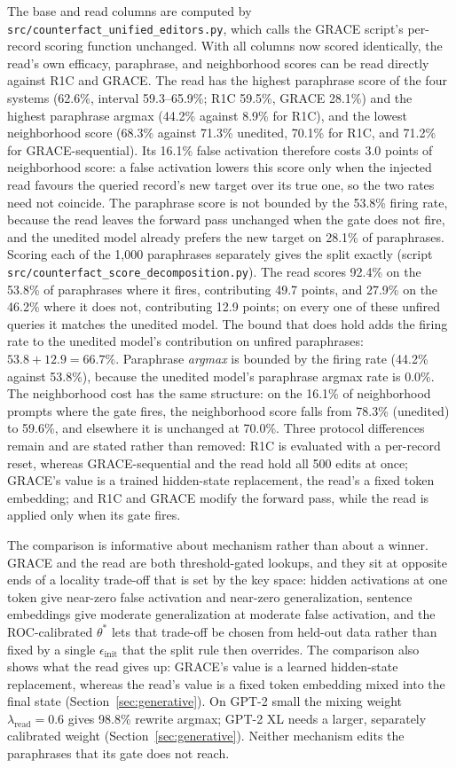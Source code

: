 \documentclass[preprint,12pt]{elsarticle}
\newif\ifmarkchanges
\newcommand{\rev}[1]{#1}
\newcommand{\revii}[1]{\ifmarkchanges{\color{blue}#1}\else#1\fi}
\begin{document}
\rev{The base and read columns are computed by \nolinkurl{src/counterfact_unified_editors.py}, which calls the GRACE script's per-record scoring function unchanged. With all columns now scored identically, the read's own efficacy, paraphrase, and neighborhood scores can be read directly against R1C and GRACE. The read has the highest paraphrase score of the four systems (62.6\%, interval 59.3--65.9\%; R1C 59.5\%, GRACE 28.1\%) and the highest paraphrase argmax (44.2\% against 8.9\% for R1C), and the lowest neighborhood score (68.3\% against 71.3\% unedited, 70.1\% for R1C, and 71.2\% for GRACE-sequential). Its 16.1\% false activation therefore costs 3.0 points of neighborhood score: a false activation lowers this score only when the injected read favours the queried record's new target over its true one, so the two rates need not coincide.} \revii{The paraphrase score is not bounded by the 53.8\% firing rate, because the read leaves the forward pass unchanged when the gate does not fire, and the unedited model already prefers the new target on 28.1\% of paraphrases. Scoring each of the 1,000 paraphrases separately gives the split exactly (script \nolinkurl{src/counterfact_score_decomposition.py}). The read scores 92.4\% on the 53.8\% of paraphrases where it fires, contributing 49.7 points, and 27.9\% on the 46.2\% where it does not, contributing 12.9 points; on every one of these unfired queries it matches the unedited model. The bound that does hold adds the firing rate to the unedited model's contribution on unfired paraphrases: $53.8+12.9=66.7\%$. Paraphrase \emph{argmax} is bounded by the firing rate (44.2\% against 53.8\%), because the unedited model's paraphrase argmax rate is 0.0\%. The neighborhood cost has the same structure: on the 16.1\% of neighborhood prompts where the gate fires, the neighborhood score falls from 78.3\% (unedited) to 59.6\%, and elsewhere it is unchanged at 70.0\%.} Three protocol differences remain and are stated rather than removed: R1C is evaluated with a per-record reset, whereas GRACE-sequential and the read hold all 500 edits at once; GRACE's value is a trained hidden-state replacement, the read's a fixed token embedding; and R1C and GRACE modify the forward pass, while the read is applied only when its gate fires.

The comparison is informative about mechanism rather than about a winner. GRACE and the read are both threshold-gated lookups, and they sit at opposite ends of a locality trade-off that is set by the key space: hidden activations at one token give near-zero false activation and near-zero generalization, sentence embeddings give moderate generalization at moderate false activation, and the ROC-calibrated $\theta^*$ lets that trade-off be chosen from held-out data rather than fixed by a single $\epsilon_{\mathrm{init}}$ that the split rule then overrides. The comparison also shows what the read gives up: GRACE's value is a learned hidden-state replacement, whereas the read's value is a fixed token embedding mixed into the final state (Section~\ref{sec:generative}). On GPT-2 small the mixing weight $\lambda_{\mathrm{read}}=0.6$ gives 98.8\% rewrite argmax; GPT-2 XL needs a larger, separately calibrated weight (Section~\ref{sec:generative}). Neither mechanism edits the paraphrases that its gate does not reach.
\end{document}
